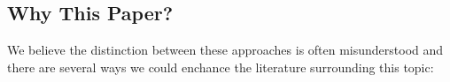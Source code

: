




\maketitle

\linenumbers

\clearpage

% 

\clearpage

\section*{}

\subsection*{Why This Paper?}

We believe the distinction between these approaches is often misunderstood and there are several ways we could enchance the literature surrounding this topic:

